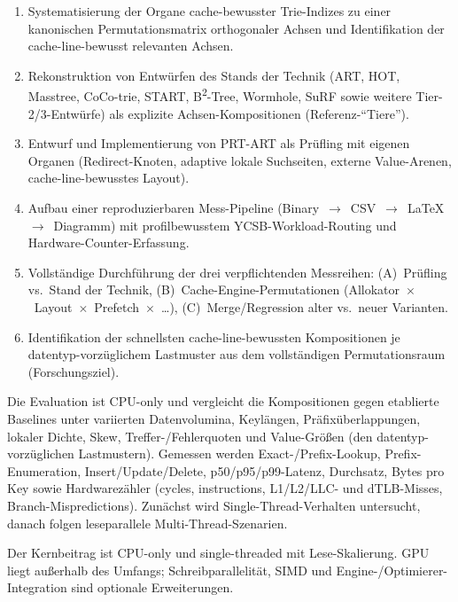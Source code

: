 \begin{enumerate}
  \item Systematisierung der Organe cache-bewusster Trie-Indizes zu einer
        kanonischen Permutationsmatrix orthogonaler Achsen und Identifikation der
        cache-line-bewusst relevanten Achsen.
  \item Rekonstruktion von Entwürfen des Stands der Technik (ART, HOT, Masstree,
        CoCo-trie, START, B\textsuperscript{2}-Tree, Wormhole, SuRF sowie
        weitere Tier-2/3-Entwürfe) als explizite Achsen-Kompositionen
        (Referenz-``Tiere'').
  \item Entwurf und Implementierung von PRT-ART als Prüfling mit eigenen Organen
        (Redirect-Knoten, adaptive lokale Suchseiten, externe Value-Arenen,
        cache-line-bewusstes Layout).
  \item Aufbau einer reproduzierbaren Mess-Pipeline
        (Binary~$\to$~CSV~$\to$~LaTeX~$\to$~Diagramm) mit profilbewusstem
        YCSB-Workload-Routing und Hardware-Counter-Erfassung.
  \item Vollständige Durchführung der drei verpflichtenden Messreihen:
        (A)~Prüfling vs.\ Stand der Technik, (B)~Cache-Engine-Permutationen
        (Allokator~$\times$~Layout~$\times$~Prefetch~$\times$~\ldots),
        (C)~Merge/Regression alter vs.\ neuer Varianten.
  \item Identifikation der schnellsten cache-line-bewussten Kompositionen je
        datentyp-vorzüglichem Lastmuster aus dem vollständigen Permutationsraum
        (Forschungsziel).
\end{enumerate}

Die Evaluation ist CPU-only und vergleicht die Kompositionen gegen etablierte
Baselines unter variierten Datenvolumina, Keylängen, Präfixüberlappungen,
lokaler Dichte, Skew, Treffer-/Fehlerquoten und Value-Größen (den
datentyp-vorzüglichen Lastmustern). Gemessen werden Exact-/Prefix-Lookup,
Prefix-Enumeration, Insert/Update/Delete, p50/p95/p99-Latenz, Durchsatz, Bytes
pro Key sowie Hardwarezähler (cycles, instructions, L1/L2/LLC- und dTLB-Misses,
Branch-Mispredictions). Zunächst wird Single-Thread-Verhalten untersucht, danach
folgen leseparallele Multi-Thread-Szenarien.

Der Kernbeitrag ist CPU-only und single-threaded mit Lese-Skalierung. GPU liegt
außerhalb des Umfangs; Schreibparallelität, SIMD und Engine-/Optimierer-Integration
sind optionale Erweiterungen.
